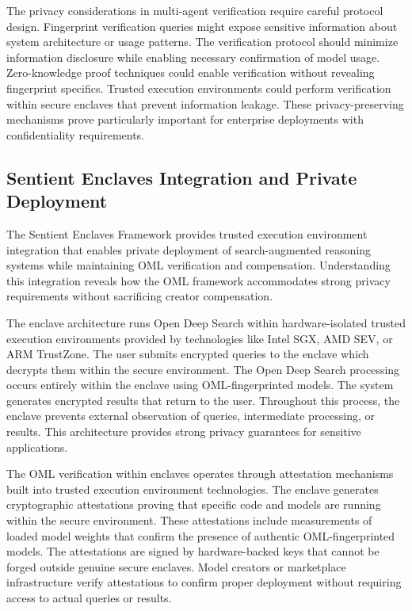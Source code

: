 The privacy considerations in multi-agent verification require careful protocol design. Fingerprint verification queries might expose sensitive information about system architecture or usage patterns. The verification protocol should minimize information disclosure while enabling necessary confirmation of model usage. Zero-knowledge proof techniques could enable verification without revealing fingerprint specifics. Trusted execution environments could perform verification within secure enclaves that prevent information leakage. These privacy-preserving mechanisms prove particularly important for enterprise deployments with confidentiality requirements.

\subsection{Sentient Enclaves Integration and Private Deployment}

The Sentient Enclaves Framework provides trusted execution environment integration that enables private deployment of search-augmented reasoning systems while maintaining OML verification and compensation. Understanding this integration reveals how the OML framework accommodates strong privacy requirements without sacrificing creator compensation.

The enclave architecture runs Open Deep Search within hardware-isolated trusted execution environments provided by technologies like Intel SGX, AMD SEV, or ARM TrustZone. The user submits encrypted queries to the enclave which decrypts them within the secure environment. The Open Deep Search processing occurs entirely within the enclave using OML-fingerprinted models. The system generates encrypted results that return to the user. Throughout this process, the enclave prevents external observation of queries, intermediate processing, or results. This architecture provides strong privacy guarantees for sensitive applications.

The OML verification within enclaves operates through attestation mechanisms built into trusted execution environment technologies. The enclave generates cryptographic attestations proving that specific code and models are running within the secure environment. These attestations include measurements of loaded model weights that confirm the presence of authentic OML-fingerprinted models. The attestations are signed by hardware-backed keys that cannot be forged outside genuine secure enclaves. Model creators or marketplace infrastructure verify attestations to confirm proper deployment without requiring access to actual queries or results.


